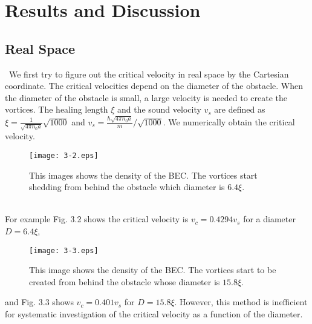 \documentclass[12pt,a4paper]{jbook}
\begin{document}
\newpage
\section{Results and Discussion}
\subsection{Real Space}
\ We first try to figure out the critical velocity in real space by the Cartesian coordinate.
The critical velocities depend on the diameter of the obstacle.
When the diameter of the obstacle is small, a large velocity is needed to create the vortices.
The healing length $\xi$ and the sound velocity $v_s$ are defined as
$\xi = \frac{1}{\sqrt{4 \pi n_0 a}}\sqrt{1000}$ and $v_s = \frac{\hbar \sqrt{4 \pi n_0 a}}{m}/\sqrt{1000}$.
We numerically obtain the critical velocity.
\begin{figure}[htbp]\begin{center}
\texttt{[image: 3-2.eps]}
\caption{
This images shows the density of the BEC.
The vortices start shedding from behind the obstacle which diameter is $6.4\xi$.
}
\label{FIG:3-2}
\end{center}\end{figure}
\\ For example Fig. 3.2 shows the critical velocity is $v_c = 0.4294v_s$ for a diameter $D = 6.4\xi$,
\begin{figure}[htbp]\begin{center}
\texttt{[image: 3-3.eps]}
\caption{
This image shows the density of the BEC.
The vortices start to be created from behind the obstacle whose diameter is $15.8 \xi$.
}
\label{FIG:3-3}
\end{center}\end{figure}
and Fig. 3.3 shows $v_c = 0.401v_s$ for $D = 15.8\xi$.
However, this method is inefficient for systematic investigation of the critical velocity
as a function of the diameter.
\end{document}
